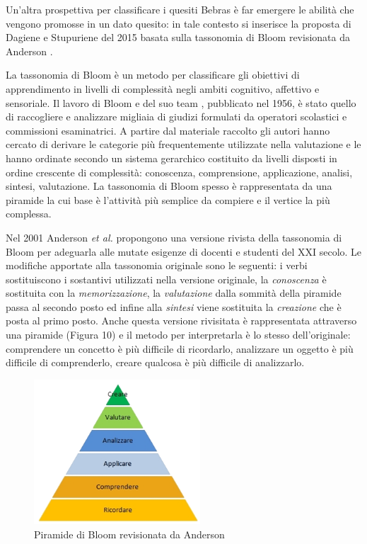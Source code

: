 \documentclass[12pt]{report}
\begin{document}
Un'altra prospettiva per classificare i quesiti Bebras è far emergere le abilità che vengono promosse in un dato quesito: in tale contesto si inserisce la proposta di Dagiene e Stupuriene del 2015 \cite{DagieneKEYCIT2015} basata sulla tassonomia di Bloom revisionata da Anderson \cite{Anderson}.

La tassonomia di Bloom è un metodo per classificare gli obiettivi di apprendimento in livelli di complessità negli ambiti cognitivo, affettivo e sensoriale. 
Il lavoro di Bloom e del suo team \cite{Bloom}, pubblicato nel 1956, è stato quello di raccogliere e analizzare migliaia di giudizi formulati da operatori scolastici e commissioni esaminatrici.
A partire dal materiale raccolto gli autori hanno cercato di derivare le categorie più frequentemente utilizzate nella valutazione e le hanno ordinate secondo un sistema gerarchico costituito da livelli disposti in ordine crescente di complessità: conoscenza, comprensione, applicazione, analisi, sintesi, valutazione.
La tassonomia di Bloom spesso è rappresentata da una piramide la cui base è l'attività più semplice da compiere e il vertice la più complessa.


Nel 2001 Anderson \textit{et al.} \cite{Anderson} propongono una versione rivista della tassonomia di Bloom per adeguarla alle mutate esigenze di docenti e studenti del XXI secolo.
Le modifiche apportate alla tassonomia originale sono le seguenti: i verbi sostituiscono i sostantivi utilizzati nella versione originale, la \textit{conoscenza} è sostituita con la \textit{memorizzazione}, la \textit{valutazione} dalla sommità della piramide passa al secondo posto ed infine alla \textit{sintesi} viene sostituita la \textit{creazione} che è posta al primo posto.
Anche questa versione rivisitata è rappresentata attraverso una piramide (Figura 10) e il metodo per interpretarla è lo stesso dell'originale: comprendere un concetto è più difficile di ricordarlo, analizzare un oggetto è più difficile di comprenderlo, creare qualcosa è più difficile di analizzarlo.

\begin{figure}[H]
	\centering
	\includegraphics[height=5.4cm]{./immagini/01_Cap1/TassonomiaBloom}
	\caption{Piramide di Bloom revisionata da Anderson}
\end{figure}
\end{document}
